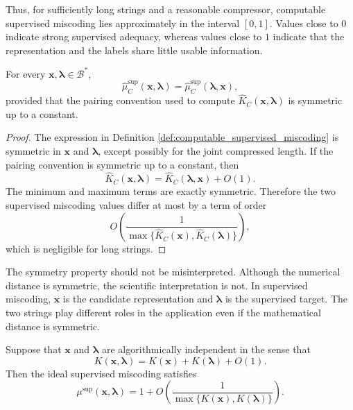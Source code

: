 Thus, for sufficiently long strings and a reasonable compressor, computable supervised miscoding lies approximately in the interval \([0,1]\). Values close to \(0\) indicate strong supervised adequacy, whereas values close to \(1\) indicate that the representation and the labels share little usable information.

\begin{proposition}
\label{prop:supervised_miscoding_symmetry}
For every \(\mathbf{x},\boldsymbol{\lambda}\in\mathcal B^\ast\),
\[
    \hat\mu_C^{\mathrm{sup}}(\mathbf{x},\boldsymbol{\lambda})
    =
    \hat\mu_C^{\mathrm{sup}}(\boldsymbol{\lambda},\mathbf{x}),
\]
provided that the pairing convention used to compute \(\hat K_C(\mathbf{x},\boldsymbol{\lambda})\) is symmetric up to a constant.
\end{proposition}

\begin{proof}
The expression in Definition \ref{def:computable_supervised_miscoding} is symmetric in \(\mathbf{x}\) and \(\boldsymbol{\lambda}\), except possibly for the joint compressed length. If the pairing convention is symmetric up to a constant, then
\[
    \hat K_C(\mathbf{x},\boldsymbol{\lambda})
    =
    \hat K_C(\boldsymbol{\lambda},\mathbf{x})+O(1).
\]
The minimum and maximum terms are exactly symmetric. Therefore the two supervised miscoding values differ at most by a term of order
\[
    O\left(
        \frac{1}
        {\max\{\hat K_C(\mathbf{x}),\hat K_C(\boldsymbol{\lambda})\}}
    \right),
\]
which is negligible for long strings.
\end{proof}

The symmetry property should not be misinterpreted. Although the numerical distance is symmetric, the scientific interpretation is not. In supervised miscoding, \(\mathbf{x}\) is the candidate representation and \(\boldsymbol{\lambda}\) is the supervised target. The two strings play different roles in the application even if the mathematical distance is symmetric.

\begin{proposition}
\label{prop:supervised_miscoding_irrelevant}
Suppose that \(\mathbf{x}\) and \(\boldsymbol{\lambda}\) are algorithmically independent in the sense that
\[
    K(\mathbf{x},\boldsymbol{\lambda})
    =
    K(\mathbf{x})+K(\boldsymbol{\lambda})+O(1).
\]
Then the ideal supervised miscoding satisfies
\[
    \mu^{\mathrm{sup}}(\mathbf{x},\boldsymbol{\lambda})
    =
    1+O\left(
        \frac{1}
        {\max\{K(\mathbf{x}),K(\boldsymbol{\lambda})\}}
    \right).
\]
\end{proposition}


